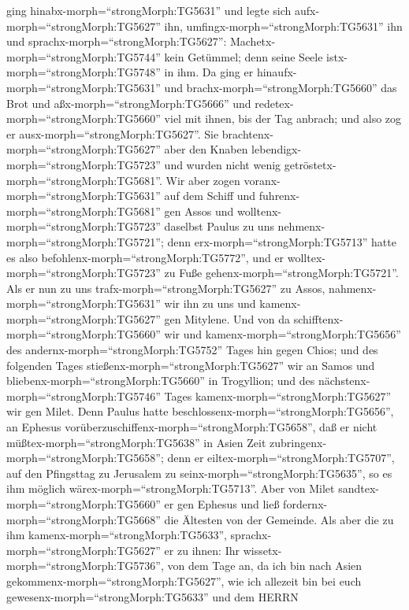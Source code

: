 ging hinabx-morph=``strongMorph:TG5631'' und legte sich
aufx-morph=``strongMorph:TG5627'' ihn,
umfingx-morph=``strongMorph:TG5631'' ihn und
sprachx-morph=``strongMorph:TG5627'':
Machetx-morph=``strongMorph:TG5744'' kein Getümmel; denn seine Seele
istx-morph=``strongMorph:TG5748'' in ihm.  Da ging er
hinaufx-morph=``strongMorph:TG5631'' und
brachx-morph=``strongMorph:TG5660'' das Brot und
aßx-morph=``strongMorph:TG5666'' und
redetex-morph=``strongMorph:TG5660'' viel mit ihnen, bis der Tag
anbrach; und also zog er ausx-morph=``strongMorph:TG5627''.
 Sie brachtenx-morph=``strongMorph:TG5627'' aber den Knaben
lebendigx-morph=``strongMorph:TG5723'' und wurden nicht wenig
getröstetx-morph=``strongMorph:TG5681''.  Wir aber zogen
voranx-morph=``strongMorph:TG5631'' auf dem Schiff und
fuhrenx-morph=``strongMorph:TG5681'' gen Assos und
wolltenx-morph=``strongMorph:TG5723'' daselbst Paulus zu uns
nehmenx-morph=``strongMorph:TG5721''; denn
erx-morph=``strongMorph:TG5713'' hatte es also
befohlenx-morph=``strongMorph:TG5772'', und er
wolltex-morph=``strongMorph:TG5723'' zu Fuße
gehenx-morph=``strongMorph:TG5721''.  Als er nun zu uns
trafx-morph=``strongMorph:TG5627'' zu Assos,
nahmenx-morph=``strongMorph:TG5631'' wir ihn zu uns und
kamenx-morph=``strongMorph:TG5627'' gen Mitylene.  Und von
da schifftenx-morph=``strongMorph:TG5660'' wir und
kamenx-morph=``strongMorph:TG5656'' des
andernx-morph=``strongMorph:TG5752'' Tages hin gegen Chios; und des
folgenden Tages stießenx-morph=``strongMorph:TG5627'' wir an Samos und
bliebenx-morph=``strongMorph:TG5660'' in Trogyllion; und des
nächstenx-morph=``strongMorph:TG5746'' Tages
kamenx-morph=``strongMorph:TG5627'' wir gen Milet.  Denn
Paulus hatte beschlossenx-morph=``strongMorph:TG5656'', an Ephesus
vorüberzuschiffenx-morph=``strongMorph:TG5658'', daß er nicht
müßtex-morph=``strongMorph:TG5638'' in Asien Zeit
zubringenx-morph=``strongMorph:TG5658''; denn er
eiltex-morph=``strongMorph:TG5707'', auf den Pfingsttag zu Jerusalem zu
seinx-morph=``strongMorph:TG5635'', so es ihm möglich
wärex-morph=``strongMorph:TG5713''.  Aber von Milet
sandtex-morph=``strongMorph:TG5660'' er gen Ephesus und ließ
fordernx-morph=``strongMorph:TG5668'' die Ältesten von der Gemeinde.
 Als aber die zu ihm kamenx-morph=``strongMorph:TG5633'',
sprachx-morph=``strongMorph:TG5627'' er zu ihnen: Ihr
wissetx-morph=``strongMorph:TG5736'', von dem Tage an, da ich bin nach
Asien gekommenx-morph=``strongMorph:TG5627'', wie ich allezeit bin bei
euch gewesenx-morph=``strongMorph:TG5633''  und dem HERRN
